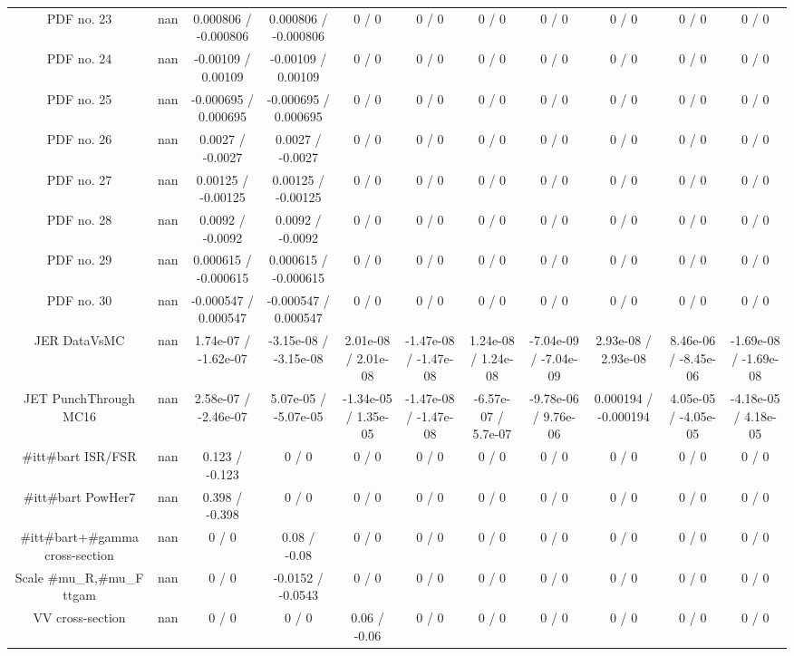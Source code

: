 \begin{table}[htbp]
\begin{center}
\begin{tabular}{|c|c|c|c|c|c|c|c|c|c|c|}
  PDF no. 23 &    nan    & 0.000806 / -0.000806 & 0.000806 / -0.000806 & 0 / 0 & 0 / 0 & 0 / 0 & 0 / 0 & 0 / 0 & 0 / 0 & 0 / 0 \\ 
  PDF no. 24 &    nan    & -0.00109 / 0.00109 & -0.00109 / 0.00109 & 0 / 0 & 0 / 0 & 0 / 0 & 0 / 0 & 0 / 0 & 0 / 0 & 0 / 0 \\ 
  PDF no. 25 &    nan    & -0.000695 / 0.000695 & -0.000695 / 0.000695 & 0 / 0 & 0 / 0 & 0 / 0 & 0 / 0 & 0 / 0 & 0 / 0 & 0 / 0 \\ 
  PDF no. 26 &    nan    & 0.0027 / -0.0027 & 0.0027 / -0.0027 & 0 / 0 & 0 / 0 & 0 / 0 & 0 / 0 & 0 / 0 & 0 / 0 & 0 / 0 \\ 
  PDF no. 27 &    nan    & 0.00125 / -0.00125 & 0.00125 / -0.00125 & 0 / 0 & 0 / 0 & 0 / 0 & 0 / 0 & 0 / 0 & 0 / 0 & 0 / 0 \\ 
  PDF no. 28 &    nan    & 0.0092 / -0.0092 & 0.0092 / -0.0092 & 0 / 0 & 0 / 0 & 0 / 0 & 0 / 0 & 0 / 0 & 0 / 0 & 0 / 0 \\ 
  PDF no. 29 &    nan    & 0.000615 / -0.000615 & 0.000615 / -0.000615 & 0 / 0 & 0 / 0 & 0 / 0 & 0 / 0 & 0 / 0 & 0 / 0 & 0 / 0 \\ 
  PDF no. 30 &    nan    & -0.000547 / 0.000547 & -0.000547 / 0.000547 & 0 / 0 & 0 / 0 & 0 / 0 & 0 / 0 & 0 / 0 & 0 / 0 & 0 / 0 \\ 
  JER DataVsMC &    nan    & 1.74e-07 / -1.62e-07 & -3.15e-08 / -3.15e-08 & 2.01e-08 / 2.01e-08 & -1.47e-08 / -1.47e-08 & 1.24e-08 / 1.24e-08 & -7.04e-09 / -7.04e-09 & 2.93e-08 / 2.93e-08 & 8.46e-06 / -8.45e-06 & -1.69e-08 / -1.69e-08 \\ 
  JET PunchThrough MC16 &    nan    & 2.58e-07 / -2.46e-07 & 5.07e-05 / -5.07e-05 & -1.34e-05 / 1.35e-05 & -1.47e-08 / -1.47e-08 & -6.57e-07 / 5.7e-07 & -9.78e-06 / 9.76e-06 & 0.000194 / -0.000194 & 4.05e-05 / -4.05e-05 & -4.18e-05 / 4.18e-05 \\ 
  #it{t#bar{t}} ISR/FSR &    nan    & 0.123 / -0.123 & 0 / 0 & 0 / 0 & 0 / 0 & 0 / 0 & 0 / 0 & 0 / 0 & 0 / 0 & 0 / 0 \\ 
  #it{t#bar{t}} PowHer7 &    nan    & 0.398 / -0.398 & 0 / 0 & 0 / 0 & 0 / 0 & 0 / 0 & 0 / 0 & 0 / 0 & 0 / 0 & 0 / 0 \\ 
  #it{t#bar{t}}+#gamma cross-section &    nan    & 0 / 0 & 0.08 / -0.08 & 0 / 0 & 0 / 0 & 0 / 0 & 0 / 0 & 0 / 0 & 0 / 0 & 0 / 0 \\ 
  Scale #mu_{R},#mu_{F} ttgam &    nan    & 0 / 0 & -0.0152 / -0.0543 & 0 / 0 & 0 / 0 & 0 / 0 & 0 / 0 & 0 / 0 & 0 / 0 & 0 / 0 \\ 
  VV cross-section &    nan    & 0 / 0 & 0 / 0 & 0.06 / -0.06 & 0 / 0 & 0 / 0 & 0 / 0 & 0 / 0 & 0 / 0 & 0 / 0 \\ 

\end{tabular}
\end{center}
\end{table}
